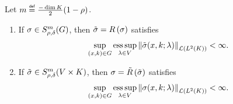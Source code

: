 \begin{lemma}
\label{lemma:inclusion_in_zero_class}
    Let $m \defeq \frac {-\dim \CompactGroup} 2 (1 - \rho)$.
    \begin{enumerate}
        \item
            If $\sigma \in \SymbolClass m {\rho, \delta}$,
            then $\tilde \sigma = \InverseRotation \sigma$ satisfies
            \begin{align*}
                \sup_{(x, k) \in \Group} \esssup_{\lambda \in \VectorSpace}
                \norm [\Lin {\Lebesgue 2 \CompactGroup}] {\tilde \sigma(x, k; \lambda)} < \infty.
            \end{align*}
        \item
            If $\tilde \sigma \in \SymbolClass [\GroupDirect] m {\rho, \delta}$,
            then $\sigma = \Rotation {\tilde \sigma}$ satisfies
            \begin{align*}
                \sup_{(x, k) \in \Group} \esssup_{\lambda \in \VectorSpace}
                \norm [\Lin {\Lebesgue 2 \CompactGroup}] {\sigma(x, k; \lambda)} < \infty.
            \end{align*}
    \end{enumerate}
\end{lemma}
